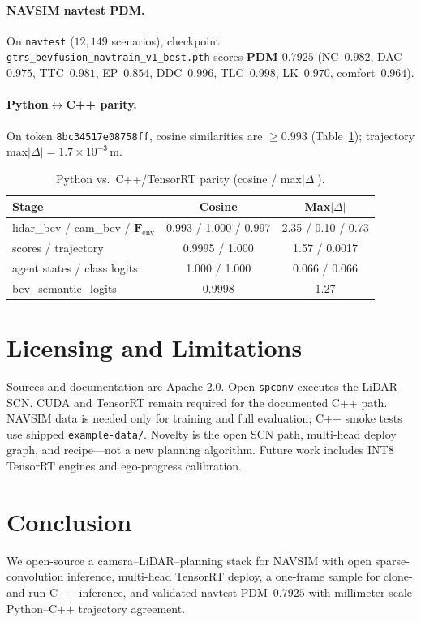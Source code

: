 \documentclass[twoside,11pt]{article}
\begin{document}
\paragraph{NAVSIM navtest PDM.}
On \texttt{navtest} ($12{,}149$ scenarios), checkpoint \texttt{gtrs\_bevfusion\_navtrain\_v1\_best.pth} scores \textbf{PDM $0.7925$} (NC~$0.982$, DAC~$0.975$, TTC~$0.981$, EP~$0.854$, DDC~$0.996$, TLC~$0.998$, LK~$0.970$, comfort~$0.964$).

\paragraph{Python$\leftrightarrow$C++ parity.}
On token \texttt{8bc34517e08758ff}, cosine similarities are $\ge 0.993$ (Table~\ref{tab:parity}); trajectory max$|\Delta|{=}1.7{\times}10^{-3}$\,m.

\begin{table}[H]
  \caption{Python vs.\ C++/TensorRT parity (cosine / max$|\Delta|$).}
  \label{tab:parity}
  \centering
  \small
  \begin{tabular}{lcc}
    \toprule
    Stage & Cosine & Max$|\Delta|$ \\
    \midrule
    lidar\_bev / cam\_bev / $\mathbf{F}_{\mathrm{env}}$ & 0.993 / 1.000 / 0.997 & 2.35 / 0.10 / 0.73 \\
    scores / trajectory & 0.9995 / 1.000 & 1.57 / 0.0017 \\
    agent states / class logits & 1.000 / 1.000 & 0.066 / 0.066 \\
    bev\_semantic\_logits & 0.9998 & 1.27 \\
    \bottomrule
  \end{tabular}
\end{table}

\section{Licensing and Limitations}
\label{sec:limits}

Sources and documentation are Apache-2.0. Open \texttt{spconv} executes the LiDAR SCN. CUDA and TensorRT remain required for the documented C++ path. NAVSIM data is needed only for training and full evaluation; C++ smoke tests use shipped \texttt{example-data/}. Novelty is the open SCN path, multi-head deploy graph, and recipe---not a new planning algorithm. Future work includes INT8 TensorRT engines and ego-progress calibration.

\section{Conclusion}
\label{sec:conclusion}
We open-source a camera--LiDAR--planning stack for NAVSIM with open sparse-convolution inference, multi-head TensorRT deploy, a one-frame sample for clone-and-run C++ inference, and validated navtest PDM~$0.7925$ with millimeter-scale Python--C++ trajectory agreement.



\end{document}
